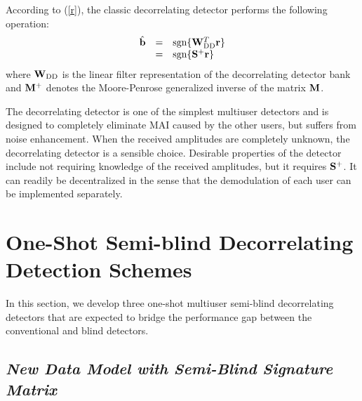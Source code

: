 \documentclass[10pt,fleqn,twocolumn]{IEEEtran}
\newcommand{\br}{{\mathbf r}}
\newcommand{\bb}{{\bf b}}
\newcommand{\bM}{{\bf M}}
\newcommand{\bS}{{\bf S}}
\newcommand{\bW}{{\bf W}}
\begin{document}
According to (\ref{r}), the classic decorrelating detector performs
the following operation:
\begin{equation}
\begin{array}{rcl}
\hat\bb&=&\mbox{sgn}\{\bW_{\rm DD}^{T}\br\}\\
 &=&\mbox{sgn}\{\bS^+\br\}
\end{array}
\end{equation}
where $\bW_{\rm DD}$ is the linear filter representation of the
decorrelating detector bank and $\bM^+$ denotes the
Moore-Penrose generalized inverse of the matrix $\bM$.

The decorrelating detector is one of the simplest multiuser
detectors and is designed to completely eliminate MAI caused by
the other users, but suffers from noise enhancement. When the
received amplitudes are completely unknown, the decorrelating
detector is a sensible choice.
Desirable properties of the detector include not requiring knowledge of
the received amplitudes, but it requires $\bS^+$. It can readily be
decentralized in the sense that the demodulation of each user can be
implemented separately.

\section{One-Shot Semi-blind Decorrelating Detection Schemes }

In this section, we develop three one-shot multiuser
semi-blind decorrelating detectors that are expected to bridge the
performance gap between the conventional and blind detectors.

\subsection{\em New Data Model with Semi-Blind Signature Matrix}
\end{document}
